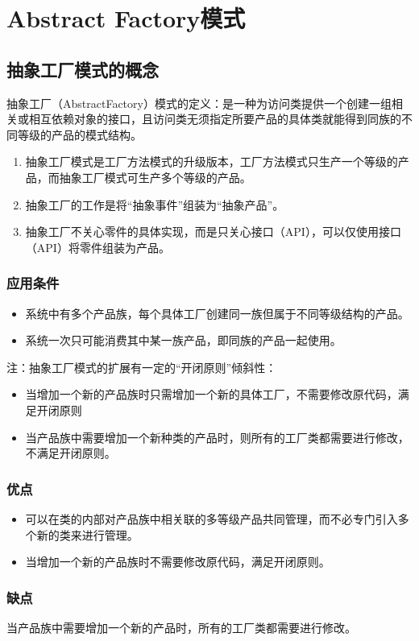 \chapter{Abstract Factory模式}
\section{抽象工厂模式的概念}
抽象工厂（AbstractFactory）模式的定义：是一种为访问类提供一个创建一组相关或相互依赖对象的接口，且访问类无须指定所要产品的具体类就能得到同族的不同等级的产品的模式结构。
\begin{enumerate}
	\item 抽象工厂模式是工厂方法模式的升级版本，工厂方法模式只生产一个等级的产品，而抽象工厂模式可生产多个等级的产品。
	\item 抽象工厂的工作是将“抽象事件”组装为“抽象产品”。
	\item 抽象工厂不关心零件的具体实现，而是只关心接口（API），可以仅使用接口（API）将零件组装为产品。
\end{enumerate}
\subsection{应用条件}
\begin{itemize}
	\item 系统中有多个产品族，每个具体工厂创建同一族但属于不同等级结构的产品。
	\item 系统一次只可能消费其中某一族产品，即同族的产品一起使用。
\end{itemize}
注：抽象工厂模式的扩展有一定的“开闭原则”倾斜性：
\begin{itemize}
	\item 当增加一个新的产品族时只需增加一个新的具体工厂，不需要修改原代码，满足开闭原则
	\item 当产品族中需要增加一个新种类的产品时，则所有的工厂类都需要进行修改，不满足开闭原则。
\end{itemize}
\subsection{优点}
\begin{itemize}
	\item 可以在类的内部对产品族中相关联的多等级产品共同管理，而不必专门引入多个新的类来进行管理。
	\item 当增加一个新的产品族时不需要修改原代码，满足开闭原则。
\end{itemize}
\subsection{缺点}
当产品族中需要增加一个新的产品时，所有的工厂类都需要进行修改。
